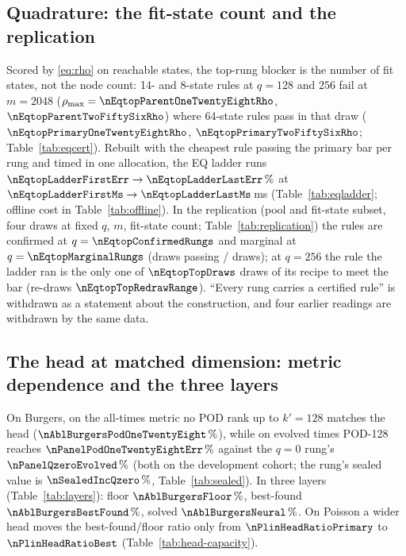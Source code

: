 \subsection{Quadrature: the fit-state count and the replication}
\label{app:extended:eq}
Scored by \eqref{eq:rho} on reachable states, the top-rung blocker is the
number of fit states, not the node count: 14- and 8-state rules at $q=128$
and $256$ fail at $m=2048$ ($\rho_{\max}=\nEqtopParentOneTwentyEightRho$,
$\nEqtopParentTwoFiftySixRho$) where 64-state rules pass in that draw
($\nEqtopPrimaryOneTwentyEightRho$, $\nEqtopPrimaryTwoFiftySixRho$;
Table~\ref{tab:eqcert}). Rebuilt with the cheapest rule passing the
primary bar per rung and timed in one allocation, the EQ ladder runs
$\nEqtopLadderFirstErr\to\nEqtopLadderLastErr\,\%$ at
$\nEqtopLadderFirstMs\to\nEqtopLadderLastMs$\,ms
(Table~\ref{tab:eqladder}; offline cost in Table~\ref{tab:offline}). In
the replication (pool and fit-state subset, four draws at fixed $q$, $m$,
fit-state count; Table~\ref{tab:replication}) the rules are confirmed at
$q=\nEqtopConfirmedRungs$ and marginal at $q=\nEqtopMarginalRungs$ (draws
passing / draws); at $q=256$ the rule the ladder ran is the only one of
$\nEqtopTopDraws$ draws of its recipe to meet the bar (re-draws
$\nEqtopTopRedrawRange$). ``Every rung carries a certified rule'' is
withdrawn as a statement about the construction, and four earlier
readings are withdrawn by the same data.

\subsection{The head at matched dimension: metric dependence and the three layers}
\label{app:extended:head}
On Burgers, on the all-times metric no POD rank up to $k'=128$ matches the
head ($\nAblBurgersPodOneTwentyEight\,\%$), while on evolved times POD-128
reaches $\nPanelPodOneTwentyEightErr\,\%$ against the $q=0$ rung's
$\nPanelQzeroEvolved\,\%$ (both on the development cohort; the rung's
sealed value is $\nSealedIncQzero\,\%$, Table~\ref{tab:sealed}). In three layers (Table~\ref{tab:layers}): floor
$\nAblBurgersFloor\,\%$, best-found $\nAblBurgersBestFound\,\%$, solved
$\nAblBurgersNeural\,\%$. On Poisson a wider head moves the
best-found/floor ratio only from $\nPlinHeadRatioPrimary$ to
$\nPlinHeadRatioBest$ (Table~\ref{tab:head-capacity}).

